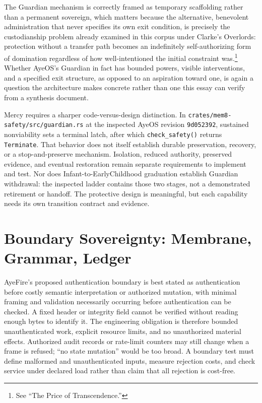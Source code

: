 \documentclass[11pt]{article}
\begin{document}
The Guardian mechanism is correctly framed as temporary scaffolding rather than a permanent sovereign, which matters because the alternative, benevolent administration that never specifies its own exit condition, is precisely the custodianship problem already examined in this corpus under Clarke's Overlords: protection without a transfer path becomes an indefinitely self-authorizing form of domination regardless of how well-intentioned the initial constraint was.\footnote{See ``The Price of Transcendence.''} Whether AyeOS's Guardian in fact has bounded powers, visible interventions, and a specified exit structure, as opposed to an aspiration toward one, is again a question the architecture makes concrete rather than one this essay can verify from a synthesis document.

Mercy requires a sharper code-versus-design distinction. In \nolinkurl{crates/mem8-safety/src/guardian.rs} at the inspected AyeOS revision \texttt{9d052392}, sustained nonviability sets a terminal latch, after which \texttt{check\_safety()} returns \texttt{Terminate}. That behavior does not itself establish durable preservation, recovery, or a stop-and-preserve mechanism. Isolation, reduced authority, preserved evidence, and eventual restoration remain separate requirements to implement and test. Nor does Infant-to-EarlyChildhood graduation establish Guardian withdrawal: the inspected ladder contains those two stages, not a demonstrated retirement or handoff. The protective design is meaningful, but each capability needs its own transition contract and evidence.

\section{Boundary Sovereignty: Membrane, Grammar, Ledger}

AyeFire's proposed authentication boundary is best stated as authentication before costly semantic interpretation or authorized mutation, with minimal framing and validation necessarily occurring before authentication can be checked. A fixed header or integrity field cannot be verified without reading enough bytes to identify it. The engineering obligation is therefore bounded unauthenticated work, explicit resource limits, and no unauthorized material effects. Authorized audit records or rate-limit counters may still change when a frame is refused; ``no state mutation'' would be too broad. A boundary test must define malformed and unauthenticated inputs, measure rejection costs, and check service under declared load rather than claim that all rejection is cost-free.
\end{document}
